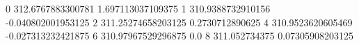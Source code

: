 0 312.6767883300781 1.697113037109375
1 310.9388732910156 -0.040802001953125
2 311.25274658203125 0.2730712890625
4 310.9523620605469 -0.027313232421875
6 310.97967529296875 0.0
8 311.052734375 0.07305908203125
